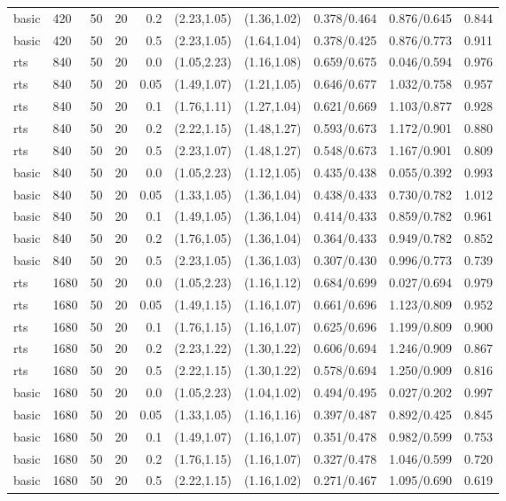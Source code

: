 \begin{tabular}{llrrrccccc}
basic & 420 & 50 & 20 & 0.2 & (2.23,1.05) & (1.36,1.02) & 0.378/0.464 & 0.876/0.645 & 0.844 \\
basic & 420 & 50 & 20 & 0.5 & (2.23,1.05) & (1.64,1.04) & 0.378/0.425 & 0.876/0.773 & 0.911 \\
rts & 840 & 50 & 20 & 0.0 & (1.05,2.23) & (1.16,1.08) & 0.659/0.675 & 0.046/0.594 & 0.976 \\
rts & 840 & 50 & 20 & 0.05 & (1.49,1.07) & (1.21,1.05) & 0.646/0.677 & 1.032/0.758 & 0.957 \\
rts & 840 & 50 & 20 & 0.1 & (1.76,1.11) & (1.27,1.04) & 0.621/0.669 & 1.103/0.877 & 0.928 \\
rts & 840 & 50 & 20 & 0.2 & (2.22,1.15) & (1.48,1.27) & 0.593/0.673 & 1.172/0.901 & 0.880 \\
rts & 840 & 50 & 20 & 0.5 & (2.23,1.07) & (1.48,1.27) & 0.548/0.673 & 1.167/0.901 & 0.809 \\
basic & 840 & 50 & 20 & 0.0 & (1.05,2.23) & (1.12,1.05) & 0.435/0.438 & 0.055/0.392 & 0.993 \\
basic & 840 & 50 & 20 & 0.05 & (1.33,1.05) & (1.36,1.04) & 0.438/0.433 & 0.730/0.782 & 1.012 \\
basic & 840 & 50 & 20 & 0.1 & (1.49,1.05) & (1.36,1.04) & 0.414/0.433 & 0.859/0.782 & 0.961 \\
basic & 840 & 50 & 20 & 0.2 & (1.76,1.05) & (1.36,1.04) & 0.364/0.433 & 0.949/0.782 & 0.852 \\
basic & 840 & 50 & 20 & 0.5 & (2.23,1.05) & (1.36,1.03) & 0.307/0.430 & 0.996/0.773 & 0.739 \\
rts & 1680 & 50 & 20 & 0.0 & (1.05,2.23) & (1.16,1.12) & 0.684/0.699 & 0.027/0.694 & 0.979 \\
rts & 1680 & 50 & 20 & 0.05 & (1.49,1.15) & (1.16,1.07) & 0.661/0.696 & 1.123/0.809 & 0.952 \\
rts & 1680 & 50 & 20 & 0.1 & (1.76,1.15) & (1.16,1.07) & 0.625/0.696 & 1.199/0.809 & 0.900 \\
rts & 1680 & 50 & 20 & 0.2 & (2.23,1.22) & (1.30,1.22) & 0.606/0.694 & 1.246/0.909 & 0.867 \\
rts & 1680 & 50 & 20 & 0.5 & (2.22,1.15) & (1.30,1.22) & 0.578/0.694 & 1.250/0.909 & 0.816 \\
basic & 1680 & 50 & 20 & 0.0 & (1.05,2.23) & (1.04,1.02) & 0.494/0.495 & 0.027/0.202 & 0.997 \\
basic & 1680 & 50 & 20 & 0.05 & (1.33,1.05) & (1.16,1.16) & 0.397/0.487 & 0.892/0.425 & 0.845 \\
basic & 1680 & 50 & 20 & 0.1 & (1.49,1.07) & (1.16,1.07) & 0.351/0.478 & 0.982/0.599 & 0.753 \\
basic & 1680 & 50 & 20 & 0.2 & (1.76,1.15) & (1.16,1.07) & 0.327/0.478 & 1.046/0.599 & 0.720 \\
basic & 1680 & 50 & 20 & 0.5 & (2.22,1.15) & (1.16,1.02) & 0.271/0.467 & 1.095/0.690 & 0.619 \\
\hline
\end{tabular}

